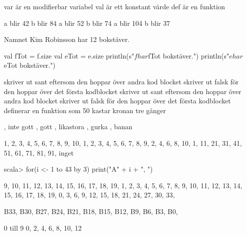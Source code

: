 \Subtask 

var är en modifierbar variabel
val är ett konstant värde
def är en funktion

\Task %

a blir 42
b blir 84
a blir 52
b blir 74
a blir 104
b blir 37

\Task %

\Subtask Namnet Kim Robinsson har 12 bokstäver.

\Subtask

\begin{REPLnonum}
val fTot = f.size
val eTot = e.size
println(s"$f har  $fTot bokstäver.")
println(s"$e har  $eTot bokstäver.")
\end{REPLnonum}

\Task %

skriver ut sant eftersom den hoppar över andra kod blocket
skriver ut falsk för den hoppar över det första kodblocket
skriver ut sant eftersom den hoppar över andra kod blocket
skriver ut falsk för den hoppar över det första kodblocket
definerar en funktion som 50%
kastar kronan tre gånger

\Task %

\Subtask {}, inte gott
\Subtask {}, gott
\Subtask {}, likastora
\Subtask {}, gurka
\Subtask {}, banan

\Task %

\Subtask 

1, 2, 3, 4, 5, 6, 7, 8, 9, 10,
1, 2, 3, 4, 5, 6, 7, 8, 9,
2, 4, 6, 8, 10,
1, 11, 21, 31, 41, 51, 61, 71, 81, 91,
inget

\Subtask 

\begin{REPLnonum}
scala> for(i <- 1 to 43 by 3) print("A" + i + ", ")
\end{REPLnonum}

\Task %

\Subtask 

9, 10, 11, 12, 13, 14, 15, 16, 17, 18, 19,
1, 2, 3, 4, 5, 6, 7, 8, 9, 10, 11, 12, 13, 14, 15, 16, 17, 18, 19,
0, 3, 6, 9, 12, 15, 18, 21, 24, 27, 30, 33,

\Subtask 

B33, B30, B27, B24, B21, B18, B15, B12, B9, B6, B3, B0,

\Task %

\Subtask 

0 till 9
0, 2, 4, 6, 8, 10, 12


